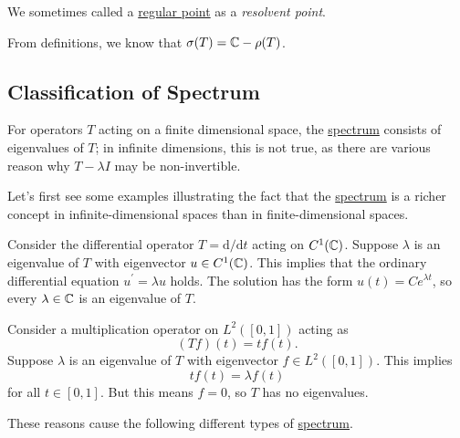 \begin{remark}
	We sometimes called a \hyperref[def:regular-point]{regular point} as a \emph{resolvent point}.
\end{remark}

From definitions, we know that \(\sigma (T) = \mathbb{\MakeUppercase{c}} - \rho (T)\).

\subsection{Classification of Spectrum}
For operators \(T\) acting on a finite dimensional space, the \hyperref[def:spectrum-point]{spectrum} consists of eigenvalues of \(T\); in infinite dimensions, this is not true, as there are various reason why \(T - \lambda I\) may be non-invertible.

Let's first see some examples illustrating the fact that the \hyperref[def:spectrum-point]{spectrum} is a richer concept in infinite-dimensional spaces than in finite-dimensional spaces.

\begin{eg}
	Consider the differential operator \(T = \mathrm{d} / \mathrm{d}t \) acting on \(C^1(\mathbb{\MakeUppercase{c}} )\). Suppose \(\lambda \) is an eigenvalue of \(T\) with eigenvector \(u\in C^1(\mathbb{\MakeUppercase{c}} )\). This implies that the ordinary differential equation \(u^\prime = \lambda u\) holds. The solution has the form \(u(t) = C e^{\lambda t}\), so every \(\lambda \in \mathbb{\MakeUppercase{c}} \) is an eigenvalue of \(T\).
\end{eg}

\begin{eg}[No eigenvalues]
	Consider a multiplication operator on \(L^2([0, 1])\) acting as
	\[
		(Tf)(t) = tf(t).
	\]
	Suppose \(\lambda \) is an eigenvalue of \(T\) with eigenvector \(f\in L^2([0, 1])\). This implies
	\[
		tf(t) = \lambda f(t)
	\]
	for all \(t\in [0, 1]\). But this means \(f=0\), so \(T\) has no eigenvalues.
\end{eg}

These reasons cause the following different types of \hyperref[def:spectrum-point]{spectrum}.

